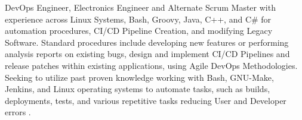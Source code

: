 %
%
%
\vspace*{-.35cm}
\textbf{}
\small{ DevOps Engineer, Electronics Engineer and Alternate Scrum Master with experience across Linux Systems, Bash, Groovy, Java, C++, and C\# for automation procedures, CI/CD Pipeline Creation, and modifying Legacy Software. Standard procedures include developing new features or performing analysis reports on existing bugs, design and implement CI/CD Pipelines and release patches within existing applications, using Agile DevOps Methodologies. Seeking to utilize past proven knowledge working with Bash, GNU-Make, Jenkins, and  Linux operating systems to automate tasks, such as builds, deployments, tests, and various repetitive tasks reducing User and Developer errors .  
}
